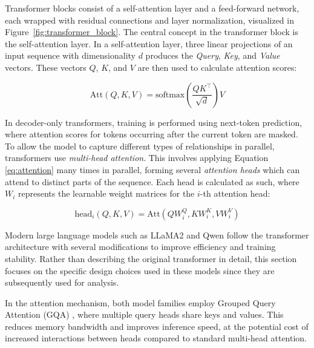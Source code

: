 


Transformer blocks consist of a self-attention layer and a feed-forward network, each wrapped with residual connections and layer normalization, visualized in Figure~\ref{fig:transformer_block}. The central concept in the transformer block is the self-attention layer. In a self-attention layer, three linear projections of an input sequence with dimensionality $d$ produces the \textit{Query}, \textit{Key}, and \textit{Value} vectors. These vectors $Q$, $K$, and $V$ are then used to calculate attention scores:

\begin{equation}\label{eq:attention}
\text{Att}(Q, K, V) = \text{softmax} \left( \frac{QK^{\top}}{\sqrt{d}} \right) V
\end{equation}

\noindent
In decoder-only transformers, training is performed using next-token prediction, where attention scores for tokens occurring after the current token are masked. To allow the model to capture different types of relationships in parallel, transformers use \textit{multi-head attention}. This involves applying Equation \ref{eq:attention} many times in parallel, forming several \textit{attention heads} which can attend to distinct parts of the sequence. Each head is calculated as such, where $W_i$ represents the learnable weight matrices for the $i$-th attention head:

\begin{equation}\label{eq:multihead}
\text{head}_i (Q, K, V) = \text{Att}(QW_i^{Q}, KW_i^{K}, VW_i^{V})
\end{equation}

Modern large language models such as LLaMA2 \citep{llama2} and Qwen \citep{qwen2.5,qwen2} follow the transformer architecture with several modifications to improve efficiency and training stability. Rather than describing the original transformer in detail, this section focuses on the specific design choices used in these models since they are subsequently used for analysis.

In the attention mechanism, both model families employ Grouped Query Attention (GQA) \citep{ainslie2023}, where multiple query heads share keys and values. This reduces memory bandwidth and improves inference speed, at the potential cost of increased interactions between heads compared to standard multi-head attention.

